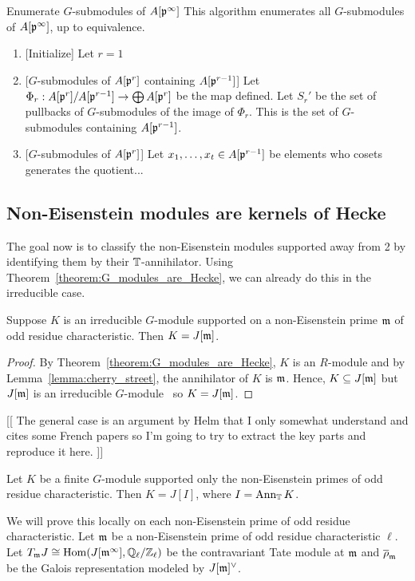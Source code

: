 \documentclass{article}
\begin{document}
\begin{algorithm}{Enumerate $G$-submodules of ${A[\mathfrak{p}^\infty]}$}
    This algorithm enumerates all $G$-submodules of $A[\mathfrak{p}^\infty]$, up to
    equivalence.
    \begin{enumerate}
        \item{} [Initialize]
            Let $r=1$
        \item{} [$G$-submodules of $A[\mathfrak{p}^r]$ containing $A[\mathfrak{p}^{r-1}]$]
            Let $\Phi_r:A[\mathfrak{p}^r]/A[\mathfrak{p}^{r-1}]\to \bigoplus A[\mathfrak{p}^r]$ be the map
            defined. Let $S_r '$ be the set of pullbacks of $G$-submodules of the
            image of $\Phi_r$. This is the set of $G$-submodules containing
            $A[\mathfrak{p}^{r-1}]$.
        \item{} [$G$-submodules of $A[\mathfrak{p}^r]$]
            Let $x_1,\ldots, x_t\in A[\mathfrak{p}^{r-1}]$ be elements who cosets
            generates the quotient...
    \end{enumerate}
\end{algorithm}

\subsection{Non-Eisenstein modules are kernels of Hecke}%
\label{sub:non_eisenstein_modules_are_kernels_of_hecke}

The goal now is to classify the non-Eisenstein modules supported away from 2 by
identifying them by their $\mathbb{T}$-annihilator. Using
Theorem~\ref{theorem:G_modules_are_Hecke}, we can already do this in the
irreducible case.
\begin{corollary}
    Suppose $K$ is an irreducible $G$-module supported on a non-Eisenstein
    prime $\mathfrak{m}$ of odd residue characteristic. Then $K=J[\mathfrak{m}]$.
\end{corollary}
\begin{proof}
    By Theorem~\ref{theorem:G_modules_are_Hecke}, $K$ is an $R$-module and by
    Lemma~\ref{lemma:cherry_street}, the annihilator of $K$ is $\mathfrak{m}$. Hence,
    $K\subseteq J[\mathfrak{m}]$ but $J[\mathfrak{m}]$ is an irreducible
    $G$-module~\cite[Proposition 14.2]{mazur:eisenstein} so $K=J[\mathfrak{m}]$.
\end{proof}

[[
The general case is an argument by Helm that I only somewhat understand and
cites some French papers so I'm going to try to extract the key parts and
reproduce it here.
]]

\begin{theorem}\label{theorem:non_eisenstein_kernel_hecke}
    Let $K$ be a finite $G$-module supported only the non-Eisenstein primes of
    odd residue characteristic. Then $K=J[I]$, where $I=\operatorname{Ann}_{\mathbb{T}} K$.
\end{theorem}
We will prove this locally on each non-Eisenstein prime of odd residue
characteristic. Let $\mathfrak{m}$ be a non-Eisenstein prime of odd residue
characteristic $\ell$. Let $T_{\mathfrak{m}} J\cong \operatorname{Hom}(J[\mathfrak{m}^\infty], \mathbb{Q}_\ell/\mathbb{Z}_\ell)$
be the contravariant Tate module at $\mathfrak{m}$ and $\overline{\rho}_{\mathfrak{m}}$ be the Galois
representation modeled by $J[\mathfrak{m}]^\vee$.
\end{document}
